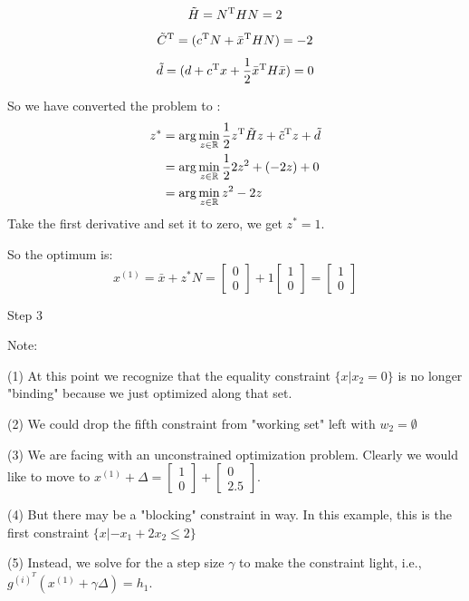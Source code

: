 $$\tilde{H} = N^{{\rm T}}HN = 2$$
$$\tilde{C}^{{\rm T}} = (c^{{\rm T}}N + \bar{x}^{{\rm T}} HN)= -2$$
$$\tilde{d}= (d+c^{{\rm T}}x + \frac{1}{2}\bar{x}^{{\rm T}}H\bar{x})=0$$


So we have converted the problem to :
\begin{align*}
z^* 
&= \arg\min_{z\in\mathbb{R}} \frac{1}{2} z^{{\rm T}}\tilde{H}z + \tilde{c}^{{\rm T}}z + \tilde{d}\\
&= \arg\min_{z\in\mathbb{R}} \frac{1}{2}2z^2 + (-2z)+ 0\\
&= \arg\min_{z\in\mathbb{R}} z^2 - 2z
\end{align*}
Take the first derivative and set it to zero, we get $z^* = 1$.

So the optimum is:
\begin{equation*}
x^{(1)}= \bar{x}+ z^*N = 
\begin{bmatrix}
0\\
0
\end{bmatrix}
 + 1
\begin{bmatrix}
1\\
0
\end{bmatrix} = 
\begin{bmatrix}
1\\
0
\end{bmatrix}
\end{equation*}


Step 3

Note:

(1) At this point we recognize that the equality constraint $\{x|x_2=0\}$ is no longer "binding" because we just optimized along that set.

(2) We could drop the fifth constraint from "working set" left with $w_2 =\emptyset$

(3) We are facing with an unconstrained optimization problem. Clearly we would like to move to $x^{(1)} +\Delta = 
\begin{bmatrix}
1\\
0
\end{bmatrix}
+
\begin{bmatrix}
0\\
2.5
\end{bmatrix}
$.

(4) But there may be a "blocking" constraint in way. In this example, this is the first constraint $\{x|-x_1 +2x_2\leq 2 \}$

(5) Instead, we solve for the a step size $\gamma$ to make the constraint light, i.e., $g^{(i)^T}(x^{(1)}+\gamma \Delta) = h_1$. 

